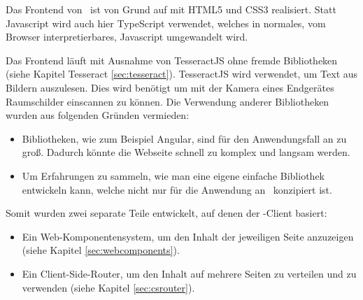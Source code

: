Das Frontend von \ZELIA\ ist von Grund auf mit HTML5 und CSS3 realisiert. Statt Javascript wird auch hier TypeScript verwendet, welches in normales, vom Browser interpretierbares, Javascript umgewandelt wird. 

Das Frontend läuft mit Ausnahme von TesseractJS ohne fremde Bibliotheken (siehe Kapitel Tesseract \ref{sec:tesseract}). TesseractJS wird verwendet, um Text aus Bildern auszulesen. Dies wird benötigt um mit der Kamera eines Endgerätes Raumschilder einscannen zu können. Die Verwendung anderer Bibliotheken wurden aus folgenden Gründen vermieden:
\begin{itemize}
    \item Bibliotheken, wie zum Beispiel Angular, sind für den Anwendungsfall an \ZELIA zu groß. Dadurch könnte die Webseite schnell zu komplex und langsam werden.
    \item Um Erfahrungen zu sammeln, wie man eine eigene einfache Bibliothek entwickeln kann, welche nicht nur für die Anwendung an \ZELIA\ konzipiert ist.
\end{itemize}

\begin{minipage}{\textwidth}
    Somit wurden zwei separate Teile entwickelt, auf denen der \ZELIA-Client basiert:
    
    \begin{itemize}
        \item Ein Web-Komponentensystem, um den Inhalt der jeweiligen Seite anzuzeigen (siehe Kapitel \ref{sec:webcomponents}).
        \item Ein Client-Side-Router, um den Inhalt auf mehrere Seiten zu verteilen und zu verwenden (siehe Kapitel \ref{sec:csrouter}).
    \end{itemize}
\end{minipage}
